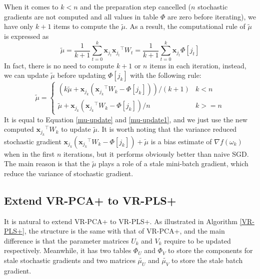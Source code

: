 \documentclass[conference]{IEEEtran}
\begin{document}
 
 
 When it comes to $k<n$ and the preparation step cancelled ($n$ stochastic gradients are not computed and all values in table $\Phi$ are zero before iterating), we have only $k+1$ items to compute the $\tilde{\mu}$. As a result, the computational rule of $\tilde{\mu}$ is expressed as 
  \begin{equation}
 \label{mu-update}
 \tilde{\mu} = \frac{1}{k+1}\sum\limits_{t=0}^{k}\mathbf{x}_{j_t}{\mathbf{x}_{j_t}}^{\top}W_t =  \frac{1}{k+1} \sum\limits_{t=0}^{k}\mathbf{x}_{j_t}\Phi[j_t]
 \end{equation}
 In fact, there is no need to compute $k+1$ or $n$ items in each iteration, instead, we can update $\tilde{\mu}$ before updating $\Phi[j_k]$ with the following rule:
  \begin{equation}
 \label{mu-update1}
 \tilde{\mu} = 
 \begin{cases}
 (k\tilde{\mu} + \mathbf{x}_{j_k}({\mathbf{x}_{j_k}}^{\top}W_k - \Phi[j_k]))/(k+1) &k<n\\
 \tilde{\mu} + \mathbf{x}_{j_k}({\mathbf{x}_{j_k}}^{\top}W_k - \Phi[{j_k}])/n &k>=n
 \end{cases}
 \end{equation}
 It is equal to Equation \ref{mu-update} and \ref{mu-update1}, and we just use the new computed ${\mathbf{x}_{j_k}}^{\top}W_k$ to update $\tilde{\mu}$.
 It is worth noting that the variance reduced stochastic gradient $\mathbf{x}_{j_k}({\mathbf{x}_{j_k}}^{\top}W_k - \Phi[{j_k}]) + \tilde{\mu}$ is a bias estimate of $\nabla f(\omega_k)$ when in the first $n$ iterations, but it performs obviously better than naive SGD. The main reason is that the $\tilde{\mu}$ plays a role of a stale mini-batch gradient, which reduce the variance of stochastic gradient.

\subsection{Extend VR-PCA+ to VR-PLS+}
It is natural to extend VR-PCA+ to VR-PLS+. As illustrated in Algorithm \ref{VR-PLS+}, the structure is the same with that of VR-PCA+, and the main difference is that the parameter matrices $U_k$ and $V_k$ require to be updated respectively. Meanwhile, it has two tables $\Phi_U$ and $\Phi_V$ to store the components for stale stochastic gradients and two matrices $\tilde{\mu_{U}}$ and $\tilde{\mu_{V}}$ to store the stale batch gradient.

 
\end{document}
